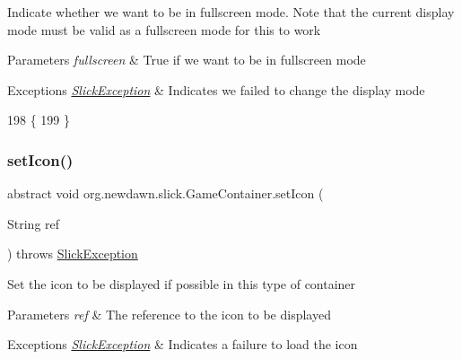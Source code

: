Indicate whether we want to be in fullscreen mode. Note that the current display mode must be valid as a fullscreen mode for this to work


\begin{DoxyParams}{Parameters}
{\em fullscreen} & True if we want to be in fullscreen mode \\
\hline
\end{DoxyParams}

\begin{DoxyExceptions}{Exceptions}
{\em \mbox{\hyperlink{classorg_1_1newdawn_1_1slick_1_1_slick_exception}{Slick\+Exception}}} & Indicates we failed to change the display mode \\
\hline
\end{DoxyExceptions}

\begin{DoxyCode}
198                                                                         \{
199     \}
\end{DoxyCode}
\mbox{\label{classorg_1_1newdawn_1_1slick_1_1_game_container_a094c28e0d9f9827b10ddcd68267c65c3}} 
\subsubsection{\texorpdfstring{set\+Icon()}{setIcon()}}
{\footnotesize\ttfamily abstract void org.\+newdawn.\+slick.\+Game\+Container.\+set\+Icon (\begin{DoxyParamCaption}\item[{String}]{ref }\end{DoxyParamCaption}) throws \mbox{\hyperlink{classorg_1_1newdawn_1_1slick_1_1_slick_exception}{Slick\+Exception}}\hspace{0.3cm}{\ttfamily [abstract]}}

Set the icon to be displayed if possible in this type of container


\begin{DoxyParams}{Parameters}
{\em ref} & The reference to the icon to be displayed \\
\hline
\end{DoxyParams}

\begin{DoxyExceptions}{Exceptions}
{\em \mbox{\hyperlink{classorg_1_1newdawn_1_1slick_1_1_slick_exception}{Slick\+Exception}}} & Indicates a failure to load the icon \\
\hline
\end{DoxyExceptions}
\mbox{\label{classorg_1_1newdawn_1_1slick_1_1_game_container_a9be825e4e0980618340296e9cbbededf}} 
